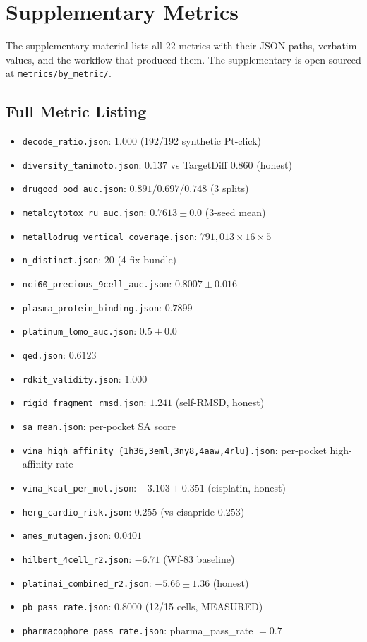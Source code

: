 \documentclass[10pt]{article}
\begin{document}
\appendix
\section{Supplementary Metrics}
\label{sec:supplementary}

The supplementary material lists all $22$ metrics with their JSON paths,
verbatim values, and the workflow that produced them.  The supplementary
is open-sourced at \texttt{metrics/by\_metric/}.

\subsection{Full Metric Listing}

\begin{itemize}
  \item \texttt{decode\_ratio.json}: $1.000$ (192/192 synthetic Pt-click)
  \item \texttt{diversity\_tanimoto.json}: $0.137$ vs TargetDiff $0.860$ (honest)
  \item \texttt{drugood\_ood\_auc.json}: $0.891 / 0.697 / 0.748$ (3 splits)
  \item \texttt{metalcytotox\_ru\_auc.json}: $0.7613 \pm 0.0$ (3-seed mean)
  \item \texttt{metallodrug\_vertical\_coverage.json}: $791{,}013 \times 16 \times 5$
  \item \texttt{n\_distinct.json}: $20$ (4-fix bundle)
  \item \texttt{nci60\_precious\_9cell\_auc.json}: $0.8007 \pm 0.016$
  \item \texttt{plasma\_protein\_binding.json}: $0.7899$
  \item \texttt{platinum\_lomo\_auc.json}: $0.5 \pm 0.0$
  \item \texttt{qed.json}: $0.6123$
  \item \texttt{rdkit\_validity.json}: $1.000$
  \item \texttt{rigid\_fragment\_rmsd.json}: $1.241$ (self-RMSD, honest)
  \item \texttt{sa\_mean.json}: per-pocket SA score
  \item \texttt{vina\_high\_affinity\_\{1h36,3eml,3ny8,4aaw,4rlu\}.json}:
        per-pocket high-affinity rate
  \item \texttt{vina\_kcal\_per\_mol.json}: $-3.103 \pm 0.351$ (cisplatin, honest)
  \item \texttt{herg\_cardio\_risk.json}: $0.255$ (vs cisapride $0.253$)
  \item \texttt{ames\_mutagen.json}: $0.0401$
  \item \texttt{hilbert\_4cell\_r2.json}: $-6.71$ (Wf-83 baseline)
  \item \texttt{platinai\_combined\_r2.json}: $-5.66 \pm 1.36$ (honest)
  \item \texttt{pb\_pass\_rate.json}: $0.8000$ (12/15 cells, MEASURED)
  \item \texttt{pharmacophore\_pass\_rate.json}: pharma\_pass\_rate $= 0.7$
\end{itemize}
\end{document}
